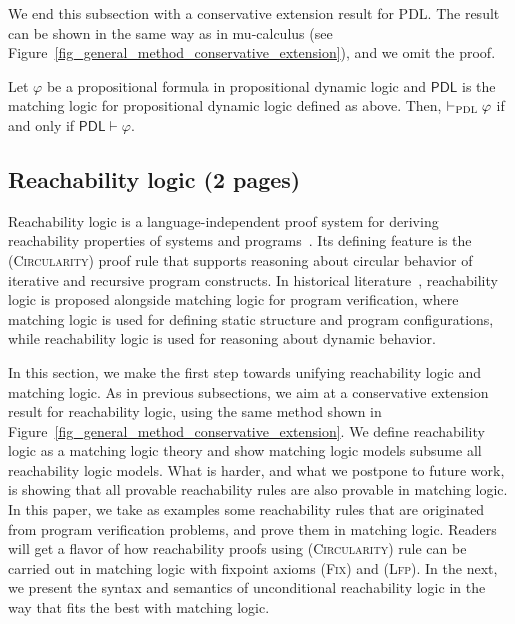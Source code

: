 \documentclass[acmsmall,review,anonymous]{acmart}
\newcommand{\MLPDL}{\mathsf{PDL}}
\newcommand{\prule}[1]{\textsc{(#1)}}
\newcommand{\circularity}{\prule{Circularity}\xspace}
\newcommand{\Lfp}{\prule{Lfp}\xspace}
\newcommand{\Fix}{\prule{Fix}\xspace}
\newcommand{\PDL}{\textsc{PDL}}
\begin{document}
We end this subsection with a conservative extension result for PDL.
The result can be shown in the same way as in mu-calculus 
(see Figure~\ref{fig_general_method_conservative_extension}),
and we omit the proof.
\begin{theorem}
Let $\varphi$ be a propositional formula in propositional dynamic logic
and $\MLPDL$ is the matching logic for propositional dynamic logic defined as above.
Then, $\vdash_\PDL\varphi$ if and only if $\MLPDL \vdash \varphi$.
\end{theorem}

\subsection{Reachability logic (2 pages)}

Reachability logic is a language-independent proof system for deriving reachability properties
of systems and programs~\cite{bibid}.
Its defining feature is the \circularity proof rule that supports reasoning about
circular behavior of iterative and recursive program constructs.
In historical literature~\cite{bibid},
reachability logic is proposed alongside matching logic for program verification,
where matching logic is used for defining static structure and
program configurations, while reachability logic is used for reasoning about dynamic behavior.


In this section, we make the first step towards 
unifying reachability logic and matching logic.
As in previous subsections, we aim at a conservative extension result
for reachability logic,
using the same method shown in 
Figure~\ref{fig_general_method_conservative_extension}.
We define reachability logic as a matching logic theory
and show 
matching logic models subsume all reachability logic models.
What is harder, and what we postpone to future work,
is showing that 
all provable reachability rules are also provable in matching logic.
In this paper, we take as examples some reachability rules that are
originated from program verification problems,
and prove them in matching logic.
Readers will get a flavor of how reachability proofs using \circularity rule
can be  carried out in matching logic with fixpoint axioms \Fix and \Lfp.
In the next, we present the syntax and semantics of unconditional reachability 
logic in the way that fits the best with matching logic.
\end{document}
